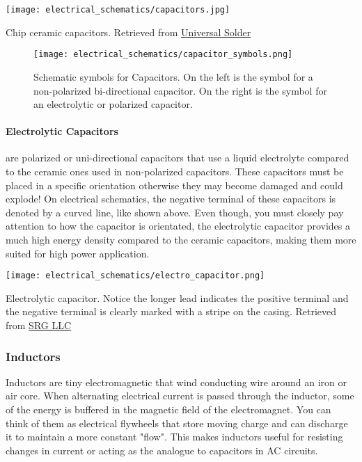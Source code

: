         \begin{marginfigure}[-2in]
            \texttt{[image: electrical\_schematics/capacitors.jpg]}
            \caption{Chip ceramic capacitors.
            Retrieved from \href{https://universal-solder.ca/product/320-pcs-ultimate-smd-1206-ceramic-capacitors-kit-10pf-to-22uf/}{Universal Solder}}
        \end{marginfigure}

        \begin{figure}[h!]
            \texttt{[image: electrical\_schematics/capacitor\_symbols.png]}
            \caption[Potentiometer Symbol]{Schematic symbols for Capacitors. 
            On the left is the symbol for a non-polarized bi-directional capacitor.
            On the right is the symbol for an electrolytic or polarized capacitor.}
        \end{figure}

        \paragraph*{Electrolytic Capacitors} are polarized or uni-directional capacitors that use a liquid electrolyte compared to the ceramic ones used in non-polarized capacitors.
        These capacitors must be placed in a specific orientation otherwise they may become damaged and could explode!
        On electrical schematics, the negative terminal of these capacitors is denoted by a curved line, like shown above.
        Even though, you must closely pay attention to how the capacitor is orientated, the electrolytic capacitor provides a much high energy density compared to the ceramic capacitors, making them more suited for high power application.

        \begin{marginfigure}[-1.5in]
            \texttt{[image: electrical\_schematics/electro\_capacitor.png]}
            \caption{Electrolytic capacitor.
            Notice the longer lead indicates the positive terminal and the negative terminal is clearly marked with a stripe on the casing.
            Retrieved from \href{https://www.srgllc.com/us/en/settlements/electronics/electrolytic-capacitors-indirect-purchaser}{SRG LLC}}
        \end{marginfigure}

        \subsubsection*{Inductors}
        Inductors are tiny electromagnetic that wind conducting wire around an iron or air core.
        When alternating electrical current is passed through the inductor, some of the energy is buffered in the magnetic field of the electromagnet. 
        You can think of them as electrical flywheels that store moving charge and can discharge it to maintain a more constant "flow".
        This makes inductors useful for resisting changes in current or acting as the analogue to capacitors in AC circuits.

